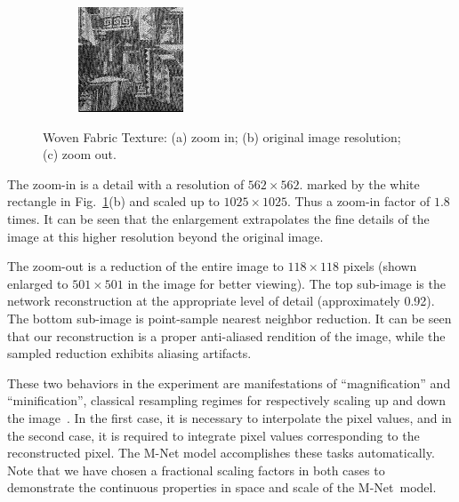 \begin{figure}[!h]
\begin{subfigure}{.19\linewidth}
\vspace{0.05cm}
\includegraphics[width=\linewidth]{img/ch5/tex_zoom_out_stage_5.png}
\caption{}
\end{subfigure}
\caption{Woven Fabric Texture: (a) zoom in; (b) original image resolution; (c) zoom out.}
\label{f:pattern}
\end{figure}


The zoom-in is a detail with a resolution of $562\times 562$. marked by the white rectangle in Fig.~\ref{f:pattern}(b) and scaled up to $1025\times 1025$. Thus a zoom-in factor of $1.8$ times. It can be seen that the enlargement extrapolates the fine details of the image at this higher resolution beyond the original image. 

The zoom-out is a reduction of the entire image to $118\times 118$ pixels (shown enlarged to $501\times 501$ in the image for better viewing). The top sub-image is the network reconstruction at the appropriate level of detail (approximately 0.92). The bottom sub-image is point-sample nearest neighbor reduction. It can be seen that our reconstruction is a proper anti-aliased rendition of the image, while the sampled reduction exhibits aliasing artifacts.

These two behaviors in the experiment are manifestations of ``magnification'' and ``minification'', classical resampling regimes for respectively scaling up and down the image~\cite{pixel}. In the first case, it is necessary to interpolate the pixel values, and in the second case, it is required to integrate pixel values corresponding to the reconstructed pixel. The M-Net model accomplishes these tasks automatically.
Note that we have chosen a fractional scaling factors in both cases to demonstrate the continuous properties in space and scale of the M-Net~model.


